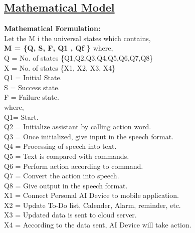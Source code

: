      \subsection*{\underline{Mathematical Model}}
  \textbf{Mathematical Formulation:}\\
Let the M i the universal states which contains, \\
    \textbf{M = \{Q, S, F, Q1 , Qf \}} \newline
    where, \\
    \newline
    		Q = No. of states \{Q1,Q2,Q3,Q4,Q5,Q6,Q7,Q8\}\\
    		X = No. of states \{X1, X2, X3, X4\}\\
    		Q1 = Initial State.\\
    		S = Success state.\\
    		F = Failure state.\\
    		\newline
    where,\\ 
    \newline
    Q1= Start.\\
     \newline
    Q2 = Initialize assistant by calling action word. \\
    \newline
    Q3 = Once initialized, give input in the speech format.\\
    \newline
    Q4 = Processing of speech into text.\\
    \newline 
    Q5 = Text is compared with commands.\\
    \newline
    Q6 = Perform action according to command.\\
    \newline 
    Q7 = Convert the action into speech.\\
    \newline 
    Q8 = Give output in the speech format.\\
    \newline
    X1 = Connect Personal AI Device to mobile application.\\
    \newline
    X2 = Update To-Do list, Calender, Alarm, reminder, etc.\\
    \newline
    X3 = Updated data is sent to cloud server.\\
    \newline
    X4 = According to the data sent, AI Device will take action.\\
    \newline

